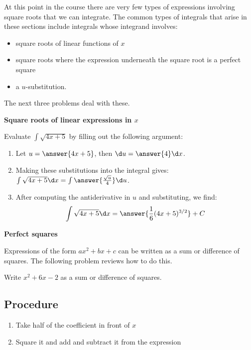\documentclass{ximera}
\author{}
\begin{document}
\begin{exercise}

  At this point in the course there are very few types of expressions involving square roots that we can integrate.  The common types of integrals that arise in these sections include integrals whose integrand involves:
  \begin{itemize}
    \item
      square roots of linear functions of $x$
      
    \item
      square roots where the expression underneath the square root is a perfect square
    
    \item
      a $u$-substitution.
  \end{itemize}
  
  The next three problems deal with these.
  

\begin{problem} \textbf{Square roots of linear expressions in $x$}

  Evaluate $\int \sqrt{4x + 5}$ by filling out the following argument:
  \begin{enumerate}
    \item Let $u = \answer{4x + 5}$, then $\d u = \answer{4} \d x$.
    \item Making these substitutions into the integral gives: $\int \sqrt{4x + 5} \d x = \int \answer{\frac{\sqrt{u}}{4}} \d u$.
    \item After computing the antiderivative in $u$ and substituting, we find:
    \[
      \int \sqrt{4x + 5} \d x = \answer{\frac{1}{6}(4x+5)^{3/2}} + C
    \]
  \end{enumerate}
\end{problem}

\begin{problem}\textbf{Perfect squares}


  Expressions of the form $ax^2 + bx + c$ can be written as a sum or difference of squares.
  The following problem reviews how to do this.
  
  Write $x^2 + 6x - 2$ as a sum or difference of squares.
  
  \subsection{Procedure}
  \begin{enumerate}
    \item Take half of the coefficient in front of $x$
    \item Square it and add and subtract it from the expression


\end{enumerate}
\end{problem}
\end{exercise}
\end{document}
